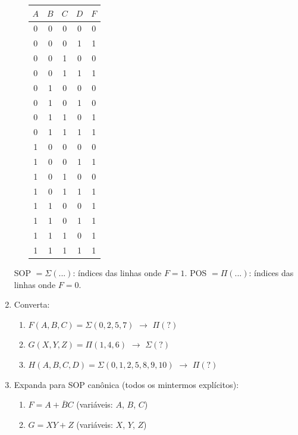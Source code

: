 \documentclass[11pt, a4paper]{article}
\begin{document}
\begin{enumerate}
\begin{minipage}[t]{0.48\textwidth}
\begin{enumerate}
\begin{tabular}{cccc|c}
\toprule
$A$ & $B$ & $C$ & $D$ & $F$ \\
\midrule
0 & 0 & 0 & 0 & 0 \\
0 & 0 & 0 & 1 & 1 \\
0 & 0 & 1 & 0 & 0 \\
0 & 0 & 1 & 1 & 1 \\
0 & 1 & 0 & 0 & 0 \\
0 & 1 & 0 & 1 & 0 \\
0 & 1 & 1 & 0 & 1 \\
0 & 1 & 1 & 1 & 1 \\
1 & 0 & 0 & 0 & 0 \\
1 & 0 & 0 & 1 & 1 \\
1 & 0 & 1 & 0 & 0 \\
1 & 0 & 1 & 1 & 1 \\
1 & 1 & 0 & 0 & 1 \\
1 & 1 & 0 & 1 & 1 \\
1 & 1 & 1 & 0 & 1 \\
1 & 1 & 1 & 1 & 1 \\
\bottomrule
\end{tabular}
\end{enumerate}
\end{minipage}%
\hfill
\begin{minipage}[t]{0.48\textwidth}
\vspace{1.5em}
\begin{dica}
SOP $= \Sigma(...)$: \'{i}ndices das linhas onde $F=1$. \quad POS $= \Pi(...)$: \'{i}ndices das linhas onde $F=0$.
\end{dica}
\end{minipage}

\newpage
\item Converta:
\begin{enumerate}
  \item $F(A,B,C) = \Sigma(0, 2, 5, 7)$ \quad $\rightarrow$ \quad $\Pi(?)$
  \item $G(X,Y,Z) = \Pi(1, 4, 6)$ \quad $\rightarrow$ \quad $\Sigma(?)$
  \item $H(A,B,C,D) = \Sigma(0, 1, 2, 5, 8, 9, 10)$ \quad $\rightarrow$ \quad $\Pi(?)$
\end{enumerate}

\vfill

\item Expanda para SOP can\^{o}nica (todos os mintermos expl\'{i}citos):
\begin{enumerate}
  \item $F = A + \overline{B}C$ \quad (vari\'{a}veis: $A$, $B$, $C$)
  \item $G = XY + Z$ \quad (vari\'{a}veis: $X$, $Y$, $Z$)
\end{enumerate}


\end{enumerate}
\end{document}
